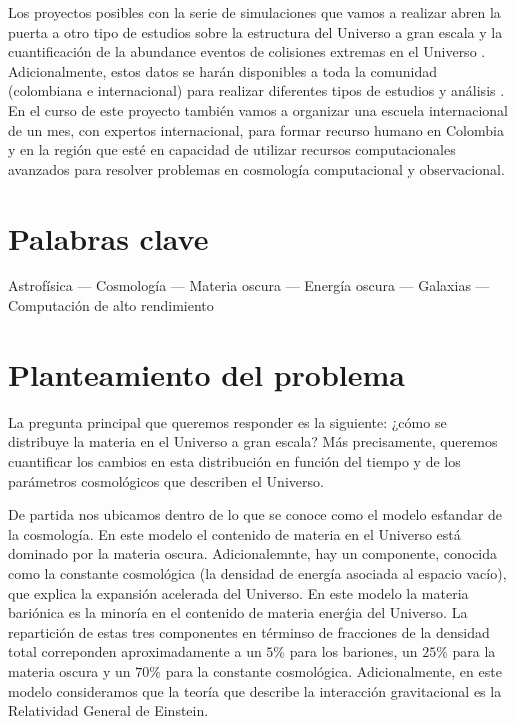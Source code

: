 \documentclass[12pt]{article}
\begin{document}
Los proyectos posibles con la serie de simulaciones que vamos a
realizar abren la puerta a otro tipo de estudios sobre la estructura
del Universo a gran escala \cite{Tweb,Vweb} y la cuantificaci\'on de
la abundance eventos de colisiones extremas en el Universo
\cite{Bullets2010,Bullets2014}. Adicionalmente, estos datos se
har\'an disponibles a toda la comunidad (colombiana e internacional)
para realizar diferentes tipos de estudios y an\'alisis \cite{Multidark}. 
En el curso de este proyecto tambi\'en vamos a organizar una escuela
internacional de un mes, con expertos internacional, para formar 
recurso humano en Colombia y en la regi\'on que est\'e en capacidad de
utilizar recursos computacionales avanzados para resolver problemas en
cosmolog\'ia computacional y observacional.



\section{Palabras clave}

Astrof\'isica --- Cosmolog\'ia --- Materia oscura --- Energ\'ia oscura
--- Galaxias --- Computaci\'on de alto rendimiento 



\section{Planteamiento del problema}

La pregunta principal que queremos responder es la siguiente: ¿cómo se
distribuye la materia en el Universo a gran escala? M\'as precisamente,
queremos cuantificar los cambios en esta distribuci\'on en funci\'on
del tiempo y de los par\'ametros cosmol\'ogicos que describen el
Universo.

De partida nos ubicamos dentro de lo que se conoce como el modelo
es\'tandar de la cosmolog\'ia. En este modelo el contenido de materia
en el Universo est\'a dominado por la materia oscura. Adicionalemnte,
hay un componente, conocida como la constante cosmol\'ogica (la
densidad de energ\'ia asociada al espacio vac\'io), que explica la
expansi\'on acelerada del Universo. En este modelo la materia
bari\'onica es la minor\'ia en el contenido de materia ener\'gia del
Universo. La repartici\'on de estas tres componentes en t\'erminso de
fracciones de la densidad total correponden aproximadamente a un $5\%$
para los bariones, un $25\%$ para la materia oscura y un $70\%$ para
la constante cosmol\'ogica. Adicionalmente, en este modelo
consideramos que la teor\'ia que describe la interacci\'on
gravitacional es la Relatividad General de Einstein.
\end{document}
